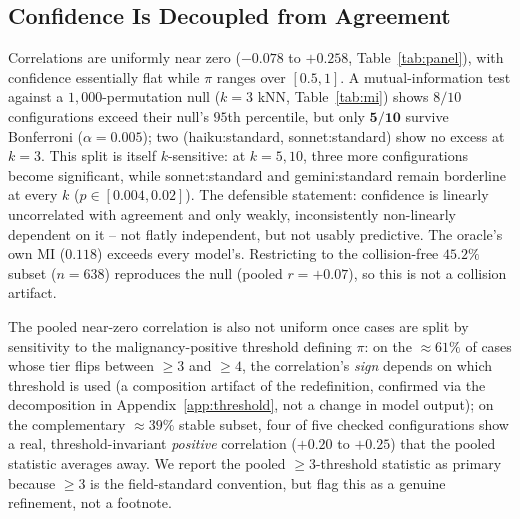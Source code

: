 \documentclass[letterpaper]{article} %
\begin{document}
\subsection{Confidence Is Decoupled from Agreement}
\label{sec:decoupling}
Correlations are uniformly near zero ($-0.078$ to $+0.258$, Table~\ref{tab:panel}),
with confidence essentially flat while $\pi$ ranges over $[0.5,1]$. A
mutual-information test against a
$1{,}000$-permutation null ($k{=}3$ kNN, Table~\ref{tab:mi}) shows $8/10$
configurations exceed their null's $95$th percentile, but only $\mathbf{5/10}$
survive Bonferroni ($\alpha{=}0.005$); two (haiku:standard, sonnet:standard)
show no excess at $k{=}3$. This split is itself $k$-sensitive: at $k{=}5,10$,
three more configurations become significant, while sonnet:standard and
gemini:standard remain borderline at every $k$ ($p\in[0.004,0.02]$). The
defensible statement: confidence is linearly uncorrelated with agreement and
only weakly, inconsistently non-linearly dependent on it -- not flatly
independent, but not usably predictive. The oracle's own MI ($0.118$)
exceeds every model's. Restricting to the collision-free $45.2\%$ subset
($n{=}638$) reproduces the null (pooled $r{=}{+}0.07$), so this is not a
collision artifact.

The pooled near-zero correlation is also not uniform once cases are split by
sensitivity to the malignancy-positive threshold defining $\pi$: on the
$\approx61\%$ of cases whose tier flips between $\geq3$ and $\geq4$, the
correlation's \emph{sign} depends on which threshold is used (a composition
artifact of the redefinition, confirmed via the decomposition in
Appendix~\ref{app:threshold}, not a change in model output); on the
complementary $\approx39\%$ stable subset, four of five checked
configurations show a real, threshold-invariant \emph{positive} correlation
($+0.20$ to $+0.25$) that the pooled statistic averages away. We report the
pooled $\geq3$-threshold statistic as primary because $\geq3$ is the
field-standard convention, but flag this as a genuine refinement, not a
footnote.
\end{document}

